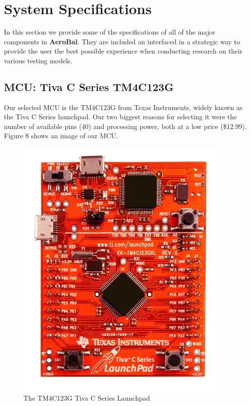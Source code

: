 \section{System Specifications}

		In this section we provide some of the specifications of all of the major components in \textbf{AeroBal}. They are included an interfaced in a strategic way to provide the user the best possible experience when conducting research on their various testing models.
		
		\subsection{MCU: Tiva C Series TM4C123G}
		
		Our selected MCU is the TM4C123G from Texas Instruments, widely known as the Tiva C Series launchpad. Our two biggest reasons for selecting it were the number of available pins (40) and processing power, both at a low price (\$12.99). Figure 8 shows an image of our MCU.
		
		\begin{figure}[H]
			\centering
				\includegraphics[scale=2.0]{img/tivaCSeriesPNG}
			\caption{The TM4C123G Tiva C Series Launchpad}
		\end{figure}
		
